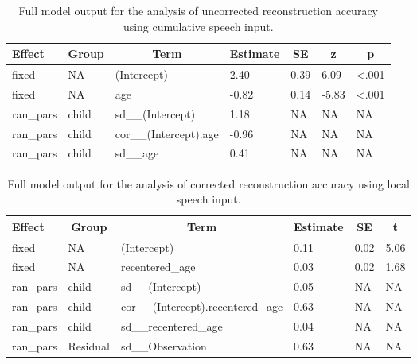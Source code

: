 \documentclass[
  english,
  man,floatsintext]{apa6}
\begin{document}
\begin{table}[tbp]

\begin{center}
\begin{threeparttable}

\caption{\label{tab:tab-uncorr_reconstr_acc-cumu-MAIN}Full model output for the analysis of uncorrected reconstruction accuracy using cumulative speech input.}

\begin{tabular}{lllllll}
\toprule
Effect & \multicolumn{1}{c}{Group} & \multicolumn{1}{c}{Term} & \multicolumn{1}{c}{Estimate} & \multicolumn{1}{c}{SE} & \multicolumn{1}{c}{z} & \multicolumn{1}{c}{p}\\
\midrule
fixed & NA & (Intercept) & 2.40 & 0.39 & 6.09 & <.001\\
fixed & NA & age & -0.82 & 0.14 & -5.83 & <.001\\
ran\_pars & child & sd\_\_(Intercept) & 1.18 & NA & NA & NA\\
ran\_pars & child & cor\_\_(Intercept).age & -0.96 & NA & NA & NA\\
ran\_pars & child & sd\_\_age & 0.41 & NA & NA & NA\\
\bottomrule
\end{tabular}

\end{threeparttable}
\end{center}

\end{table}

\begin{table}[tbp]

\begin{center}
\begin{threeparttable}

\caption{\label{tab:tab-corr_reconstr_acc-local-MAIN}Full model output for the analysis of corrected reconstruction accuracy using local speech input.}

\begin{tabular}{llllll}
\toprule
Effect & \multicolumn{1}{c}{Group} & \multicolumn{1}{c}{Term} & \multicolumn{1}{c}{Estimate} & \multicolumn{1}{c}{SE} & \multicolumn{1}{c}{t}\\
\midrule
fixed & NA & (Intercept) & 0.11 & 0.02 & 5.06\\
fixed & NA & recentered\_age & 0.03 & 0.02 & 1.68\\
ran\_pars & child & sd\_\_(Intercept) & 0.05 & NA & NA\\
ran\_pars & child & cor\_\_(Intercept).recentered\_age & 0.63 & NA & NA\\
ran\_pars & child & sd\_\_recentered\_age & 0.04 & NA & NA\\
ran\_pars & Residual & sd\_\_Observation & 0.63 & NA & NA\\
\bottomrule
\end{tabular}

\end{threeparttable}
\end{center}

\end{table}
\end{document}
